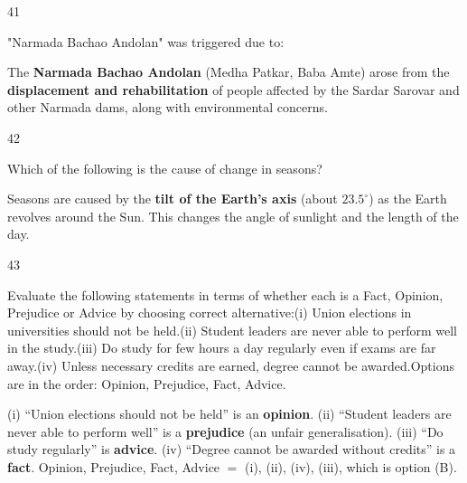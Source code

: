 \begin{question}{41}
{"Narmada Bachao Andolan" was triggered due to:\par}
\begin{explain}
The \textbf{Narmada Bachao Andolan} (Medha Patkar, Baba Amte) arose from the \textbf{displacement and rehabilitation} of people affected by the Sardar Sarovar and other Narmada dams, along with environmental concerns.
\end{explain}
\end{question}

\begin{question}{42}
{Which of the following is the cause of change in seasons?\par}
\begin{explain}
Seasons are caused by the \textbf{tilt of the Earth's axis} (about $23.5^\circ$) as the Earth revolves around the Sun. This changes the angle of sunlight and the length of the day.
\end{explain}
\end{question}

\begin{question}{43}
{Evaluate the following statements in terms of whether each is a Fact, Opinion, Prejudice or Advice by choosing correct alternative:\newline (i) Union elections in universities should not be held.\newline (ii) Student leaders are never able to perform well in the study.\newline (iii) Do study for few hours a day regularly even if exams are far away.\newline (iv) Unless necessary credits are earned, degree cannot be awarded.\newline Options are in the order: Opinion, Prejudice, Fact, Advice.\par}
\begin{explain}
(i) ``Union elections should not be held'' is an \textbf{opinion}. (ii) ``Student leaders are never able to perform well'' is a \textbf{prejudice} (an unfair generalisation). (iii) ``Do study regularly'' is \textbf{advice}. (iv) ``Degree cannot be awarded without credits'' is a \textbf{fact}.
Opinion, Prejudice, Fact, Advice $=$ (i), (ii), (iv), (iii), which is option (B).
\end{explain}
\end{question}

